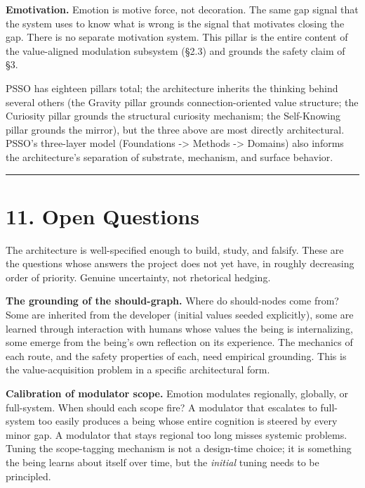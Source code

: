 \documentclass[12pt]{article}
\begin{document}
\textbf{Emotivation.} Emotion is motive force, not decoration. The same gap signal that the system uses to know what is wrong is the signal that motivates closing the gap. There is no separate motivation system. This pillar is the entire content of the value-aligned modulation subsystem (§2.3) and grounds the safety claim of §3.

PSSO has eighteen pillars total; the architecture inherits the thinking behind several others (the Gravity pillar grounds connection-oriented value structure; the Curiosity pillar grounds the structural curiosity mechanism; the Self-Knowing pillar grounds the mirror), but the three above are most directly architectural. PSSO's three-layer model (Foundations -\textgreater{} Methods -\textgreater{} Domains) also informs the architecture's separation of substrate, mechanism, and surface behavior.

\begin{center}\rule{0.5\linewidth}{0.5pt}\end{center}

\section{11. Open Questions}\label{open-questions}

The architecture is well-specified enough to build, study, and falsify. These are the questions whose answers the project does not yet have, in roughly decreasing order of priority. Genuine uncertainty, not rhetorical hedging.

\textbf{The grounding of the should-graph.} Where do should-nodes come from? Some are inherited from the developer (initial values seeded explicitly), some are learned through interaction with humans whose values the being is internalizing, some emerge from the being's own reflection on its experience. The mechanics of each route, and the safety properties of each, need empirical grounding. This is the value-acquisition problem in a specific architectural form.

\textbf{Calibration of modulator scope.} Emotion modulates regionally, globally, or full-system. When should each scope fire? A modulator that escalates to full-system too easily produces a being whose entire cognition is steered by every minor gap. A modulator that stays regional too long misses systemic problems. Tuning the scope-tagging mechanism is not a design-time choice; it is something the being learns about itself over time, but the \emph{initial} tuning needs to be principled.
\end{document}
